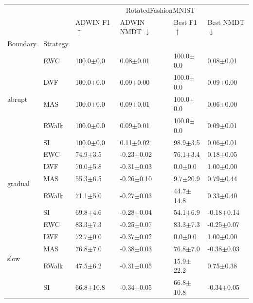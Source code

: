 \begin{tabular}{llllll}
\toprule
 &  & \multicolumn{4}{c}{RotatedFashionMNIST} \\
 &  & ADWIN F1 $\uparrow$ & ADWIN NMDT $\downarrow$ & Best F1 $\uparrow$ & Best NMDT $\downarrow$ \\
Boundary & Strategy &  &  &  &  \\
\midrule
\multirow[t]{5}{*}{abrupt} & EWC & 100.0\tiny{$\pm$0.0} & 0.08\tiny{$\pm$0.01} & 100.0\tiny{$\pm$0.0} & 0.08\tiny{$\pm$0.01} \\
 & LWF & 100.0\tiny{$\pm$0.0} & 0.09\tiny{$\pm$0.00} & 100.0\tiny{$\pm$0.0} & 0.09\tiny{$\pm$0.00} \\
 & MAS & 100.0\tiny{$\pm$0.0} & 0.09\tiny{$\pm$0.01} & 100.0\tiny{$\pm$0.0} & 0.06\tiny{$\pm$0.00} \\
 & RWalk & 100.0\tiny{$\pm$0.0} & 0.09\tiny{$\pm$0.01} & 100.0\tiny{$\pm$0.0} & 0.09\tiny{$\pm$0.01} \\
 & SI & 100.0\tiny{$\pm$0.0} & 0.11\tiny{$\pm$0.02} & 98.9\tiny{$\pm$3.5} & 0.06\tiny{$\pm$0.01} \\
\midrule
\multirow[t]{5}{*}{gradual} & EWC & 74.9\tiny{$\pm$3.5} & -0.23\tiny{$\pm$0.02} & 76.1\tiny{$\pm$3.4} & 0.18\tiny{$\pm$0.05} \\
 & LWF & 70.0\tiny{$\pm$5.8} & -0.31\tiny{$\pm$0.03} & 0.0\tiny{$\pm$0.0} & 1.00\tiny{$\pm$0.00} \\
 & MAS & 55.3\tiny{$\pm$6.5} & -0.26\tiny{$\pm$0.10} & 9.7\tiny{$\pm$20.9} & 0.79\tiny{$\pm$0.44} \\
 & RWalk & 71.1\tiny{$\pm$5.0} & -0.27\tiny{$\pm$0.03} & 44.7\tiny{$\pm$14.8} & 0.33\tiny{$\pm$0.40} \\
 & SI & 69.8\tiny{$\pm$4.6} & -0.28\tiny{$\pm$0.04} & 54.1\tiny{$\pm$6.9} & -0.18\tiny{$\pm$0.14} \\
\midrule
\multirow[t]{5}{*}{slow} & EWC & 83.3\tiny{$\pm$7.3} & -0.25\tiny{$\pm$0.07} & 83.3\tiny{$\pm$7.3} & -0.25\tiny{$\pm$0.07} \\
 & LWF & 72.7\tiny{$\pm$0.0} & -0.37\tiny{$\pm$0.02} & 0.0\tiny{$\pm$0.0} & 1.00\tiny{$\pm$0.00} \\
 & MAS & 76.8\tiny{$\pm$7.0} & -0.38\tiny{$\pm$0.03} & 76.8\tiny{$\pm$7.0} & -0.38\tiny{$\pm$0.03} \\
 & RWalk & 47.5\tiny{$\pm$6.2} & -0.31\tiny{$\pm$0.05} & 15.9\tiny{$\pm$22.2} & 0.75\tiny{$\pm$0.38} \\
 & SI & 66.8\tiny{$\pm$10.8} & -0.34\tiny{$\pm$0.05} & 66.8\tiny{$\pm$10.8} & -0.34\tiny{$\pm$0.05} \\
\bottomrule
\end{tabular}
